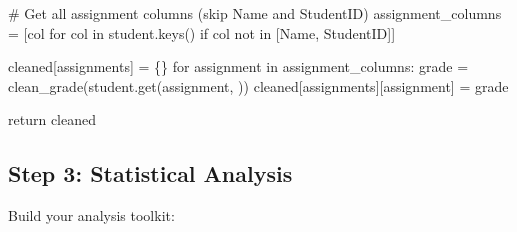 \documentclass[
  letterpaper,
  DIV=11,
  numbers=noendperiod,
  oneside]{scrreprt}
\newenvironment{Shaded}{}{}
\newcommand{\CommentTok}[1]{\textcolor[rgb]{0.42,0.45,0.49}{#1}}
\newcommand{\ControlFlowTok}[1]{\textcolor[rgb]{0.84,0.23,0.29}{#1}}
\newcommand{\KeywordTok}[1]{\textcolor[rgb]{0.84,0.23,0.29}{#1}}
\newcommand{\NormalTok}[1]{\textcolor[rgb]{0.14,0.16,0.18}{#1}}
\newcommand{\OperatorTok}[1]{\textcolor[rgb]{0.14,0.16,0.18}{#1}}
\newcommand{\StringTok}[1]{\textcolor[rgb]{0.01,0.18,0.38}{#1}}
\begin{document}
\begin{Shaded}
\begin{Highlighting}[]
    \CommentTok{\# Get all assignment columns (skip Name and StudentID)}
\NormalTok{    assignment\_columns }\OperatorTok{=}\NormalTok{ [col }\ControlFlowTok{for}\NormalTok{ col }\KeywordTok{in}\NormalTok{ student.keys() }
                         \ControlFlowTok{if}\NormalTok{ col }\KeywordTok{not} \KeywordTok{in}\NormalTok{ [}\StringTok{\textquotesingle{}Name\textquotesingle{}}\NormalTok{, }\StringTok{\textquotesingle{}StudentID\textquotesingle{}}\NormalTok{]]}
    
\NormalTok{    cleaned[}\StringTok{\textquotesingle{}assignments\textquotesingle{}}\NormalTok{] }\OperatorTok{=}\NormalTok{ \{\}}
    \ControlFlowTok{for}\NormalTok{ assignment }\KeywordTok{in}\NormalTok{ assignment\_columns:}
\NormalTok{        grade }\OperatorTok{=}\NormalTok{ clean\_grade(student.get(assignment, }\StringTok{\textquotesingle{}\textquotesingle{}}\NormalTok{))}
\NormalTok{        cleaned[}\StringTok{\textquotesingle{}assignments\textquotesingle{}}\NormalTok{][assignment] }\OperatorTok{=}\NormalTok{ grade}
    
    \ControlFlowTok{return}\NormalTok{ cleaned}
\end{Highlighting}
\end{Shaded}

\subsection{Step 3: Statistical
Analysis}\label{step-3-statistical-analysis}

Build your analysis toolkit:
\end{document}
